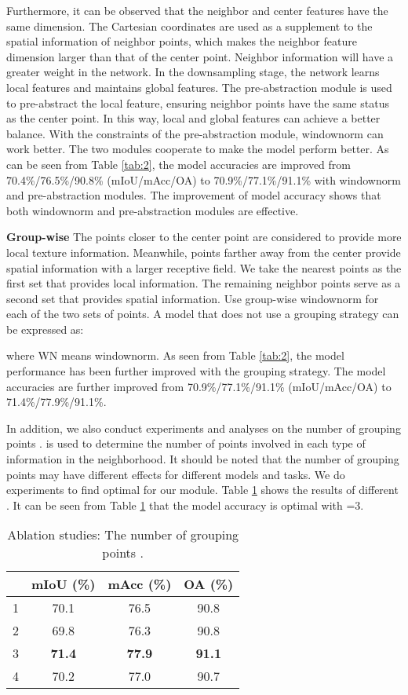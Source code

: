 \documentclass[10pt,twocolumn,letterpaper]{article}
\begin{document}
        Furthermore, it can be observed that the neighbor and center features have the same dimension. The Cartesian coordinates are used as a supplement to the spatial information of neighbor points, which makes the neighbor feature dimension larger than that of the center point. Neighbor information will have a greater weight in the network. In the downsampling stage, the network learns local features and maintains global features. The pre-abstraction module is used to pre-abstract the local feature, ensuring neighbor points have the same status as the center point. In this way, local and global features can achieve a better balance. With the constraints of the pre-abstraction module, windownorm can work better. The two modules cooperate to make the model perform better. As can be seen from Table \ref{tab:2}, the model accuracies are improved from 70.4\%/76.5\%/90.8\% (mIoU/mAcc/OA) to 70.9\%/77.1\%/91.1\% with windownorm and pre-abstraction modules. The improvement of model accuracy shows that both windownorm and pre-abstraction modules are effective.

        \textbf{Group-wise}  The points closer to the center point are considered to provide more local texture information. Meanwhile, points farther away from the center provide spatial information with a larger receptive field. We take the  nearest points as the first set that provides local information. The remaining neighbor points serve as a second set that provides spatial information. Use group-wise windownorm for each of the two sets of points. A model that does not use a grouping strategy can be expressed as:
        
        where WN means windownorm. As seen from Table \ref{tab:2}, the model performance has been further improved with the grouping strategy. The model accuracies are further improved from 70.9\%/77.1\%/91.1\% (mIoU/mAcc/OA) to 71.4\%/77.9\%/91.1\%.

        In addition, we also conduct experiments and analyses on the number of grouping points .  is used to determine the number of points involved in each type of information in the neighborhood. It should be noted that the number of grouping points  may have different effects for different models and tasks. We do experiments to find optimal  for our module. Table \ref{tab:3} shows the results of different . It can be seen from Table \ref{tab:3} that the model accuracy is optimal with =3.
        \begin{table}[!htb]\centering
            \renewcommand\arraystretch{1.1}
         \caption{Ablation studies: The number of grouping points .}
        \begin{tabular}{c|ccc}
        \toprule
         & mIoU (\%) & mAcc (\%) & OA (\%) \\ \hline
        1 & 70.1 & 76.5 & 90.8 \\
        2 & 69.8 & 76.3 & 90.8 \\
        3 & \textbf{71.4} & \textbf{77.9} & \textbf{91.1} \\
        4 & 70.2 & 77.0 & 90.7 \\
        \bottomrule
        \end{tabular}
        \label{tab:3}
        \end{table}
\end{document}

